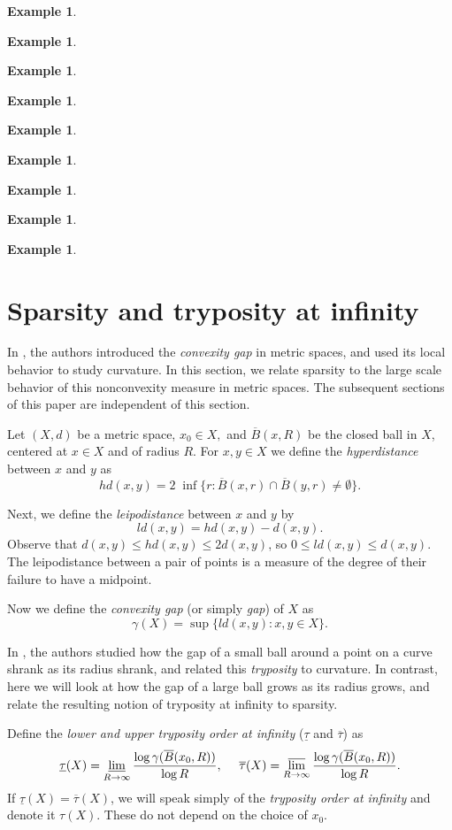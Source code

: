 \documentclass[12pt]{amsart}
\theoremstyle{definition}
\newtheorem{example}[theorem]{Example}
\theoremstyle{remark}
\numberwithin{equation}{section}
\newcommand{\lt}{\underline{\tau}}
\newcommand{\ut}{\overline{\tau}}
\newcommand{\oB}{\overline{B}}
\begin{document}
\begin{example}
\begin{example}
\begin{example}
\begin{example}
\begin{example}
\begin{example}
\begin{example}
\begin{example}
\begin{example}
\section{Sparsity and tryposity at infinity}\label{tryp}

In \cite{GM2}, the authors introduced the {\em convexity gap} in metric
spaces, and used its local behavior to study curvature. In this
section, we relate sparsity to the large scale behavior of this
nonconvexity measure in metric spaces. The subsequent sections of this
paper are independent of this section.

Let $(X,d)$ be a metric space, $x_0 \in X,$ and $\oB(x,R)$ be the
closed ball in $X$, centered at $x\in X$ and of radius $R$. For
$x,y\in X$ we define the \emph{hyperdistance} between $x$ and $y$ as
\begin{equation*}
hd(x,y)=2\;\inf\{r: \oB(x,r)\cap \oB(y,r)\neq\emptyset\}.
\end{equation*}

Next, we define the
\emph{leipodistance} between $x$ and $y$ by
\begin{equation*}
ld(x,y)=hd(x,y)-d(x,y).
\end{equation*}
Observe that $d(x,y)\le hd(x,y)\le2 d(x,y)$, so $0\le ld(x,y)\le
d(x,y)$. The leipodistance between a pair of points is a measure of
the degree of their failure to have a midpoint.

Now we define the \emph{convexity gap} (or simply \emph{gap}) of $X$
as
\begin{equation*}
\gamma(X)=\sup\{ld(x,y):x,y\in X\}.
\end{equation*}

In \cite{GM2}, the authors studied how the gap of a small ball around a point on a
curve shrank as its radius shrank, and related this {\em tryposity} to
curvature. In contrast, here we will look at how the gap of a large
ball grows as its radius grows, and relate the resulting notion of
tryposity at infinity to sparsity.

Define the \emph{lower and upper tryposity order at infinity} ($\lt$
and $\ut$) as
\begin{equation*}
\lt(X)=\varliminf_{R\to\infty}\frac{\log \gamma(\oB(x_0,R))}{\log R}, \ \ \ \
\ut(X)=\varlimsup_{R\to\infty}\frac{\log \gamma(\oB(x_0,R))}{\log R}.
\end{equation*}
If $\lt(X)=\ut(X)$, we will speak simply of the \emph{tryposity order
  at infinity} and denote it $\tau(X)$. These do not depend on the
choice of $x_0$.


\end{example}
\end{example}
\end{example}
\end{example}
\end{example}
\end{example}
\end{example}
\end{example}
\end{example}
\end{document}
